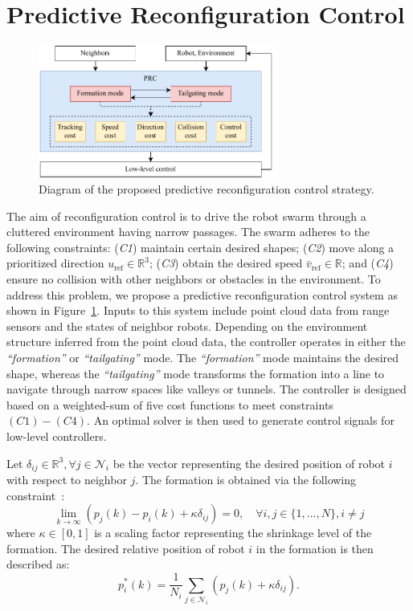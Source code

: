 \section{Predictive Reconfiguration Control}\label{sec:propose}

\begin{figure}
    \centering
    \includegraphics[width=0.7\textwidth]{paper3/images/diagram.pdf}
    \caption{Diagram of the proposed predictive reconfiguration control strategy.}
    \label{fig:diagram}
\end{figure}

The aim of reconfiguration control is to drive the robot swarm through a cluttered environment having narrow passages. The swarm adheres to the following constraints: (\textit{C1}) maintain certain desired shapes; (\textit{C2}) move along a prioritized direction $u_\text{ref}\in\mathbb{R}^{3}$; (\textit{C3}) obtain the desired speed $\bar{v}_\text{ref}\in\mathbb{R}$; and (\textit{C4}) ensure no collision with other neighbors or obstacles in the environment. To address this problem, we propose a predictive reconfiguration control system as shown in Figure~\ref{fig:diagram}. Inputs to this system include point cloud data from range sensors and the states of neighbor robots. Depending on the environment structure inferred from the point cloud data, the controller operates in either the \textit{``formation''} or \textit{``tailgating''} mode. The \textit{``formation''} mode maintains the desired shape, whereas the \textit{``tailgating''} mode transforms the formation into a line to navigate through narrow spaces like valleys or tunnels. The controller is designed based on a weighted-sum of five cost functions to meet constraints $(C1)-(C4)$. An optimal solver is then used to generate control signals for low-level controllers.

Let $\delta_{ij}\in\mathbb{R}^3,\forall j\in \mathcal{N}_i$ be the vector representing the desired position of robot $i$ with respect to neighbor $j$. The formation is obtained via the following constraint~\cite{Dong2016,6798711}:
\begin{equation}
    \lim_{k\to\infty}{\left(p_j(k)-p_i(k)+\kappa\delta_{ij}\right)}=0,\quad\forall i,j\in\{1,...,N\}, i\neq j
\end{equation}
where $\kappa\in[0,1]$ is a scaling factor representing the shrinkage level of the formation. The desired relative position of robot $i$ in the formation is then described as:
\begin{equation}
    p^*_i(k)=\dfrac{1}{N_i}\sum_{j\in\mathcal{N}_i}{\left(p_j\left(k\right)+\kappa\delta_{ij}\right)}.
    \label{eqn:formation}
\end{equation}


